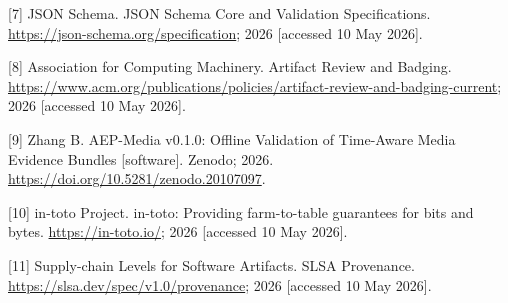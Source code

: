 \documentclass[
]{article}
\begin{document}
{[}7{]} JSON Schema. JSON Schema Core and Validation Specifications.
\url{https://json-schema.org/specification}; 2026 {[}accessed 10 May
2026{]}.

{[}8{]} Association for Computing Machinery. Artifact Review and
Badging.
\url{https://www.acm.org/publications/policies/artifact-review-and-badging-current};
2026 {[}accessed 10 May 2026{]}.

{[}9{]} Zhang B. AEP-Media v0.1.0: Offline Validation of Time-Aware
Media Evidence Bundles {[}software{]}. Zenodo; 2026.
\url{https://doi.org/10.5281/zenodo.20107097}.

{[}10{]} in-toto Project. in-toto: Providing farm-to-table guarantees
for bits and bytes. \url{https://in-toto.io/}; 2026 {[}accessed 10 May
2026{]}.

{[}11{]} Supply-chain Levels for Software Artifacts. SLSA Provenance.
\url{https://slsa.dev/spec/v1.0/provenance}; 2026 {[}accessed 10 May
2026{]}.
\end{document}
